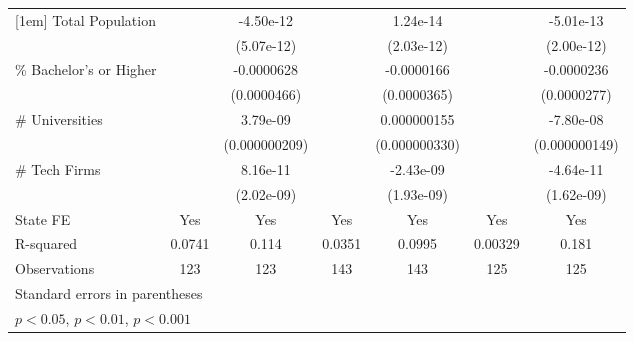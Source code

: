 {\begin{tabular}{l*{6}{c}}
[1em]
Total Population    &                     &   -4.50e-12         &                     &    1.24e-14         &                     &   -5.01e-13         \\
                    &                     &  (5.07e-12)         &                     &  (2.03e-12)         &                     &  (2.00e-12)         \\
[1em]
\% Bachelor's or Higher&                     &  -0.0000628         &                     &  -0.0000166         &                     &  -0.0000236         \\
                    &                     & (0.0000466)         &                     & (0.0000365)         &                     & (0.0000277)         \\
[1em]
\# Universities     &                     &    3.79e-09         &                     & 0.000000155         &                     &   -7.80e-08         \\
                    &                     &(0.000000209)         &                     &(0.000000330)         &                     &(0.000000149)         \\
[1em]
\# Tech Firms       &                     &    8.16e-11         &                     &   -2.43e-09         &                     &   -4.64e-11         \\
                    &                     &  (2.02e-09)         &                     &  (1.93e-09)         &                     &  (1.62e-09)         \\
\hline
State FE            &         Yes         &         Yes         &         Yes         &         Yes         &         Yes         &         Yes         \\
R-squared           &      0.0741         &       0.114         &      0.0351         &      0.0995         &     0.00329         &       0.181         \\
Observations        &         123         &         123         &         143         &         143         &         125         &         125         \\
\hline\hline
\multicolumn{7}{l}{\footnotesize Standard errors in parentheses}\\
\multicolumn{7}{l}{\footnotesize \sym{*} \(p<0.05\), \sym{**} \(p<0.01\), \sym{***} \(p<0.001\)}\\
\end{tabular}
}
